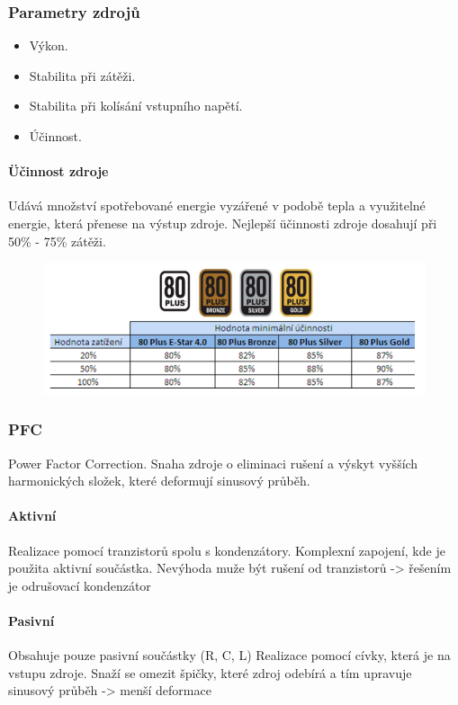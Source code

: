 \subsubsection{Parametry zdrojů}
\begin{itemize}
    \item Výkon.
    \item Stabilita při zátěži.
    \item Stabilita při kolísání vstupního napětí.
    \item Účinnost.
\end{itemize}

\paragraph{Üčinnost zdroje}
Udává množství spotřebované energie vyzářené v podobě tepla a využitelné energie, která
přenese na výstup zdroje. Nejlepší üčinnosti zdroje dosahují při 50\% - 75\% zátěži.

\begin{figure}[h]
    \centering
    \includegraphics[scale=0.5]{sections/16_zdroj_BIOS_UEFI_boot/images/Screenshot 2024-08-23 002034.png}
\end{figure}

\subsubsection{PFC}
Power Factor Correction. Snaha zdroje o eliminaci rušení a výskyt vyšších harmonických složek, které deformují sinusový průběh.
\paragraph{Aktivní}
Realizace pomocí tranzistorů spolu s kondenzátory. Komplexní zapojení, kde je použita aktivní součástka. Nevýhoda muže být rušení od tranzistorů -> řešením je odrušovací kondenzátor
\paragraph{Pasivní}
Obsahuje pouze pasivní součástky (R, C, L)
Realizace pomocí cívky, která je na vstupu zdroje. Snaží se omezit špičky, které zdroj odebírá a tím upravuje sinusový průběh -> menší deformace

